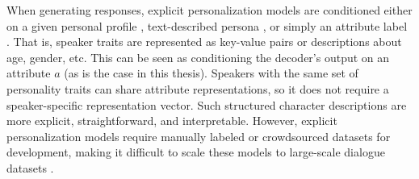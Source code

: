 When generating responses, explicit personalization models are conditioned either on a given personal profile \citep{ijcai2018-595}, text-described persona \citep{zhang-etal-2018-personalizing}, or simply an attribute label \citep{madotto-etal-2020-plug}. That is, speaker traits are represented as key-value pairs or descriptions about age, gender, etc. This can be seen as conditioning the decoder's output on an attribute $a$ (as is the case in this thesis). Speakers with the same set of personality traits can share attribute representations, so it does not require a speaker-specific representation vector. Such structured character descriptions are more explicit, straightforward, and interpretable. However, explicit personalization models require manually labeled or crowdsourced datasets for development, making it difficult to scale these models to large-scale dialogue datasets \citep{zheng2019personalized, madotto-etal-2020-plug}.



